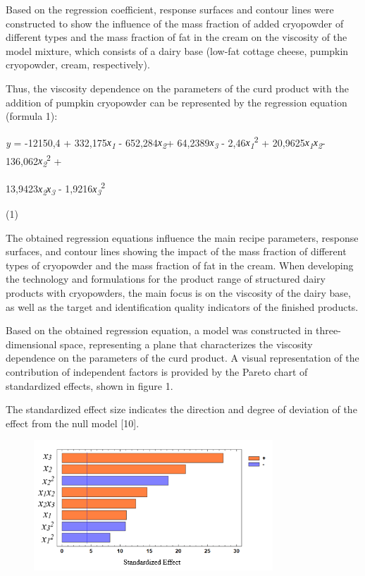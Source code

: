 Based on the regression coefficient, response surfaces and contour lines
were constructed to show the influence of the mass fraction of added
cryopowder of different types and the mass fraction of fat in the cream
on the viscosity of the model mixture, which consists of a dairy base
(low-fat cottage cheese, pumpkin cryopowder, cream, respectively).

Thus, the viscosity dependence on the parameters of the curd product
with the addition of pumpkin cryopowder can be represented by the
regression equation (formula 1):

\emph{y} = -12150,4 + 332,175\emph{х\textsubscript{1}} -
652,284\emph{х\textsubscript{2}}+ 64,2389\emph{х\textsubscript{3 }}-
2,46\emph{х\textsubscript{1}}\textsuperscript{2} +
20,9625\emph{х\textsubscript{1}х\textsubscript{2}}-
136,062\emph{х\textsubscript{2}}\textsuperscript{2} +

13,9423\emph{х\textsubscript{2}х\textsubscript{3 }}-
1,9216\emph{х\textsubscript{3}}\textsuperscript{2}

(1)

The obtained regression equations influence the main recipe parameters,
response surfaces, and contour lines showing the impact of the mass
fraction of different types of cryopowder and the mass fraction of fat
in the cream. When developing the technology and formulations for the
product range of structured dairy products with cryopowders, the main
focus is on the viscosity of the dairy base, as well as the target and
identification quality indicators of the finished products.

Based on the obtained regression equation, a model was constructed in
three-dimensional space, representing a plane that characterizes the
viscosity dependence on the parameters of the curd product. A visual
representation of the contribution of independent factors is provided by
the Pareto chart of standardized effects, shown in figure 1.

The standardized effect size indicates the direction and degree of
deviation of the effect from the null model {[}10{]}.


\begin{figure}[H]
	\centering
	\includegraphics[width=0.8\textwidth]{media/pish2/image81}
	\caption*{}
\end{figure}


